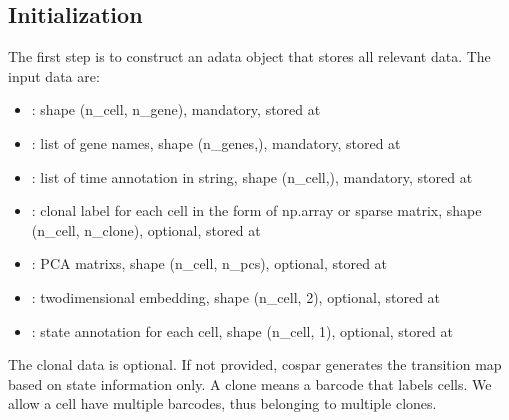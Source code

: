 \documentclass[letterpaper,10pt,english]{sphinxmanual}
\begin{document}
\subsection{Initialization}
\label{\detokenize{20210121_cospar_tutorial:Initialization}}
The first step is to construct an adata object that stores all relevant data. The input data are:
\begin{itemize}
\item {} 
: shape (n\_cell, n\_gene), mandatory, stored at 

\item {} 
: list of gene names, shape (n\_genes,), mandatory, stored at 

\item {} 
: list of time annotation in string, shape (n\_cell,), mandatory, stored at 

\item {} 
: clonal label for each cell in the form of np.array or sparse matrix, shape (n\_cell, n\_clone), optional, stored at 

\item {} 
: PCA matrixs, shape (n\_cell, n\_pcs), optional, stored at 

\item {} 
: two\sphinxhyphen{}dimensional embedding, shape (n\_cell, 2), optional, stored at 

\item {} 
: state annotation for each cell, shape (n\_cell, 1), optional, stored at 

\end{itemize}

The clonal data  is optional. If not provided, cospar generates the transition map based on state information only. A clone means a barcode that labels cells. We allow a cell have multiple barcodes, thus belonging to multiple clones.
\end{document}
